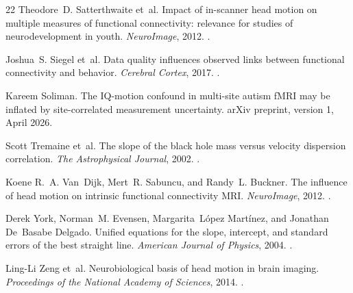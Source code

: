 \documentclass[11pt,a4paper]{article}
\begin{document}
\begin{thebibliography}{22}
Theodore~D. Satterthwaite et~al.
\newblock Impact of in-scanner head motion on multiple measures of functional connectivity: relevance for studies of neurodevelopment in youth.
\newblock \emph{NeuroImage}, 2012.
\newblock {}.

Joshua~S. Siegel et~al.
\newblock Data quality influences observed links between functional connectivity and behavior.
\newblock \emph{Cerebral Cortex}, 2017.
\newblock {}.

Kareem Soliman.
\newblock The {IQ}-motion confound in multi-site autism {fMRI} may be inflated by site-correlated measurement uncertainty.
\newblock arXiv preprint, version 1, April 2026.

Scott Tremaine et~al.
\newblock The slope of the black hole mass versus velocity dispersion correlation.
\newblock \emph{The Astrophysical Journal}, 2002.
\newblock {}.

Koene R.~A. Van~Dijk, Mert~R. Sabuncu, and Randy~L. Buckner.
\newblock The influence of head motion on intrinsic functional connectivity {MRI}.
\newblock \emph{NeuroImage}, 2012.
\newblock {}.

Derek York, Norman~M. Evensen, Margarita~L{\'o}pez Mart{\'i}nez, and Jonathan De~Basabe Delgado.
\newblock Unified equations for the slope, intercept, and standard errors of the best straight line.
\newblock \emph{American Journal of Physics}, 2004.
\newblock {}.

Ling-Li Zeng et~al.
\newblock Neurobiological basis of head motion in brain imaging.
\newblock \emph{Proceedings of the National Academy of Sciences}, 2014.
\newblock {}.

\end{thebibliography}
\end{document}
